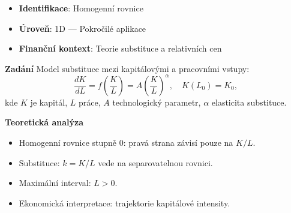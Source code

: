 \begin{example}
\label{ex:relativni-ceny}

\begin{itemize}
\item \textbf{Identifikace}: Homogenní rovnice
\item \textbf{Úroveň}: 1D — Pokročilé aplikace
\item \textbf{Finanční kontext}: Teorie substituce a relativních cen
\end{itemize}

\noindent\textbf{Zadání}
Model substituce mezi kapitálovými a pracovními vstupy:
\[
\frac{dK}{dL} = f\!\left(\frac{K}{L}\right) = A\!\left(\frac{K}{L}\right)^\alpha, \quad K(L_0) = K_0,
\]
kde $K$ je kapitál, $L$ práce, $A$ technologický parametr, $\alpha$ elasticita substituce.

\noindent\textbf{Teoretická analýza}
\begin{itemize}
\item Homogenní rovnice stupně 0: pravá strana závisí pouze na $K/L$.
\item Substituce: $k = K/L$ vede na separovatelnou rovnici.
\item Maximální interval: $L > 0$.
\item Ekonomická interpretace: trajektorie kapitálové intensity.
\end{itemize}


\end{example}
